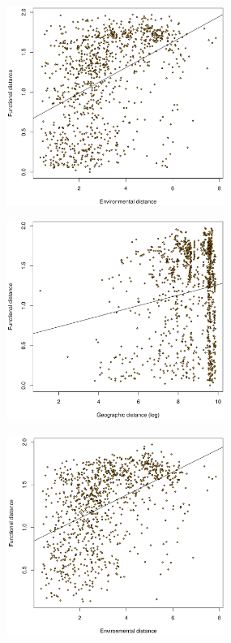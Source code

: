 \begin{figure}[!ht]
\centering
 \begin{subfigure}[t]{2.8in}
    \includegraphics[width=2.8in]{NMF/figures/figS8a}
 \end{subfigure}
 \begin{subfigure}[t]{2.8in}
    \includegraphics[width=2.8in]{NMF/figures/figS8b}
 \end{subfigure}
 \begin{subfigure}[t]{2.8in}
    \includegraphics[width=2.8in]{NMF/figures/figS8c}
 \end{subfigure}
 \begin{subfigure}[t]{2.8in}

\end{subfigure}
\end{figure}
